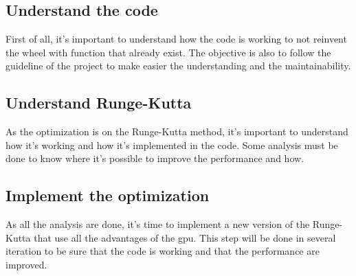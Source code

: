 \subsection{Understand the code}
\label{spec:ch:activities:improve-the-performance:understand-the-code}
First of all, it's important to understand how the code is working to not reinvent the wheel with function that already exist.
The objective is also to follow the guideline of the project to make easier the understanding and the maintainability.


\subsection{Understand Runge-Kutta}
\label{spec:ch:activities:improve-the-performance:understand-runge-kutta}
As the optimization is on the Runge-Kutta method, it's important to understand how it's working and how it's implemented in the code.
Some analysis must be done to know where it's possible to improve the performance and how.


\subsection{Implement the optimization}
\label{spec:ch:activities:improve-the-performance:implement-the-optimization}
As all the analysis are done, it's time to implement a new version of the Runge-Kutta that use all the advantages of the \acrshort{gpu}.
This step will be done in several iteration to be sure that the code is working and that the performance are improved.



